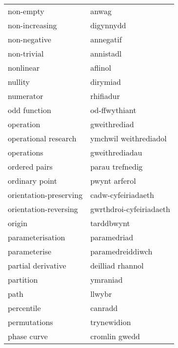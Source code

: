 \begin{supertabular}{p{0.22\textwidth}p{0.22\textwidth}}
                       non-empty &                           anwag \\
                  non-increasing &                       digynnydd \\
                    non-negative &                       annegatif \\
                     non-trivial &                       annistadl \\
                       nonlinear &                         aflinol \\
                         nullity &                        dirymiad \\
                       numerator &                       rhifiadur \\
                    odd function &                   od-ffwythiant \\
                       operation &                    gweithrediad \\
            operational research &           ymchwil weithrediadol \\
                      operations &                  gweithrediadau \\
                   ordered pairs &                 parau trefnedig \\
                  ordinary point &                   pwynt arferol \\
          orientation-preserving &              cadw-cyfeiriadaeth \\
           orientation-reversing &         gwrthdroi-cyfeiriadaeth \\
                          origin &                      tarddbwynt \\
                parameterisation &                     paramedriad \\
                    parameterise &                paramedreiddiwch \\
              partial derivative &                deilliad rhannol \\
                       partition &                        ymraniad \\
                            path &                          llwybr \\
                      percentile &                         canradd \\
                    permutations &                     trynewidion \\
                     phase curve &                   cromlin gwedd \\

\end{supertabular}
